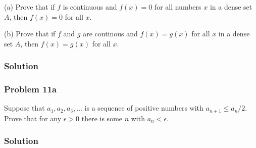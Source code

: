 \vs

(a) Prove that if $f$ is continuous and $f(x)=0$ for all numbers $x$
in a dense set $A$, then $f(x)=0$ for all $x$.

\vs

(b) Prove that if $f$ and $g$ are continous and $f(x)=g(x)$ for all
$x$ in a dense set $A$, then $f(x)=g(x)$ for all $x$.

\subsubsection*{Solution}

\subsubsection*{Problem 11a}
Suppose that $a_{1}, a_{2}, a_{3}, \ldots$ is a sequence of positive
numbers with $a_{n+1}\leq a_{n}/2$. Prove that for any $\epsilon>0$ there is
some $n$ with $a_{n}<\epsilon$.

\subsubsection*{Solution}


